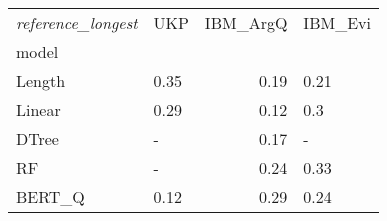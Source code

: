 \begin{tabular}{llrl}
\toprule
\textit{reference\_longest} &   UKP &  IBM\_ArgQ & IBM\_Evi \\
model  &       &           &         \\
\midrule
Length &  0.35 &      0.19 &    0.21 \\
Linear &  0.29 &      0.12 &     0.3 \\
DTree  &     - &      0.17 &       - \\
RF     &     - &      0.24 &    0.33 \\
BERT\_Q &  0.12 &      0.29 &    0.24 \\
\bottomrule
\end{tabular}
